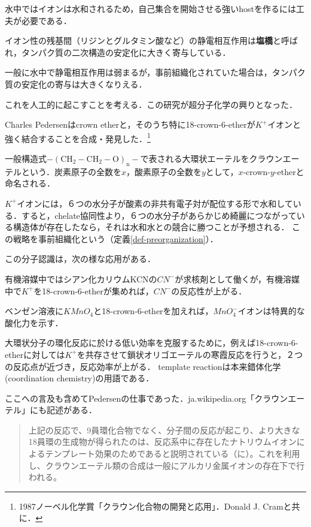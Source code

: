 \documentclass[uplatex, dvipdfmx]{jsreport}
\begin{document}
水中ではイオンは水和されるため，自己集合を開始させる強いhostを作るには工夫が必要である．
\begin{example}[事前組織化による静電気的相互作用の寄与]
    \begin{definition}
        イオン性の残基間（リジンとグルタミン酸など）の静電相互作用は\textbf{塩橋}と呼ばれ，タンパク質の二次構造の安定化に大きく寄与している．
    \end{definition}
    一般に水中で静電相互作用は弱まるが，事前組織化されていた場合は，タンパク質の安定化の寄与は大きくなりえる．
\end{example}
これを人工的に起こすことを考える．この研究が超分子化学の興りとなった．
\begin{example}
    Charles Pedersenはcrown etherと，そのうち特に18-crown-6-etherが$K^+$イオンと強く結合することを合成・発見した．\footnote{1987ノーベル化学賞「クラウン化合物の開発と応用」．Donald J. Cramと共に．}
    \begin{definition}
        一般構造式$\mathrm{-(CH_2-CH_2-O)_n-}$で表される大環状エーテルをクラウンエーテルという．炭素原子の全数を$x$，酸素原子の全数を$y$として，$x$-crown-$y$-etherと命名される．
    \end{definition}
    $K^+$イオンには，６つの水分子が酸素の非共有電子対が配位する形で水和している．すると，chelate協同性より，６つの水分子があらかじめ綺麗につながっている構造体が存在したなら，それは水和水との競合に勝つことが予想される．
    この戦略を事前組織化という（定義\ref{def-preorganization}）．

    この分子認識は，次の様な応用がある．
    \begin{application}
        有機溶媒中ではシアン化カリウムKCNの$CN^-$が求核剤として働くが，有機溶媒中で$K^+$を18-crown-6-etherが集めれば，$CN^-$の反応性が上がる．
    \end{application}
    \begin{application}
        ベンゼン溶液に$KMnO_4$と18-crown-6-etherを加えれば，$MnO_4^-$イオンは特異的な酸化力を示す．
    \end{application}
\end{example}
\begin{remark}\label{remark-template-effect}
    大環状分子の環化反応に於ける低い効率を克服するために，例えば18-crown-6-etherに対しては$K^+$を共存させて鎖状オリゴエーテルの寒霞反応を行うと，２つの反応点が近づき，反応効率が上がる．
    template reactionは本来錯体化学(coordination chemistry)の用語である．

    ここへの言及も含めてPedersenの仕事であった\cite{Pedersen}．ja.wikipedia.org「クラウンエーテル」にも記述がある．
    \begin{quote}
        上記の反応で、9員環化合物でなく、分子間の反応が起こり、より大きな18員環の生成物が得られたのは、反応系中に存在したナトリウムイオンによるテンプレート効果のためであると説明されている（\cite{Pedersen}に）。これを利用し、クラウンエーテル類の合成は一般にアルカリ金属イオンの存在下で行われる。
    \end{quote}
\end{remark}
\end{document}
